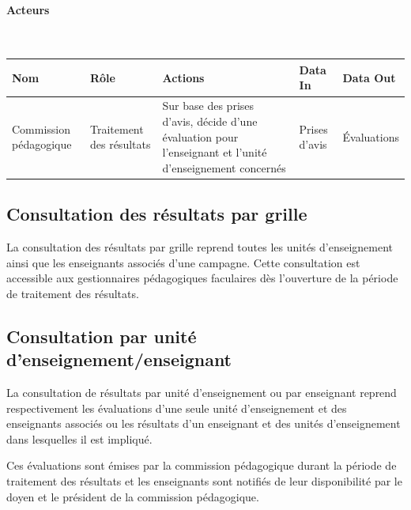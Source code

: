 \documentclass[a4paper,11pt]{report}
\begin{document}
\paragraph{Acteurs}~\newline{}

\begin{tabularx}{\linewidth}{|X|X|X|X|X|} \hline
Nom & Rôle & Actions & Data In & Data Out \\ \hline 
Commission pédagogique & Traitement des résultats & Sur base des prises d'avis, décide d'une évaluation pour l'enseignant et l'unité d'enseignement concernés & Prises d'avis & Évaluations \\ \hline
\end{tabularx}






\subsection{Consultation des résultats par grille}

La consultation des résultats par grille reprend toutes les unités d'enseignement ainsi que les enseignants associés d'une campagne.
Cette consultation est accessible aux gestionnaires pédagogiques faculaires dès l'ouverture de la période de traitement des résultats.





\subsection{Consultation par unité d'enseignement/enseignant}

La consultation de résultats par unité d'enseignement ou par enseignant reprend respectivement les évaluations d'une seule unité d'enseignement et des enseignants associés ou les résultats d'un enseignant et des unités d'enseignement dans lesquelles il est impliqué.

Ces évaluations sont émises par la commission pédagogique durant la période de traitement des résultats et les enseignants sont notifiés de leur disponibilité par le doyen et le président de la commission pédagogique.
\end{document}

